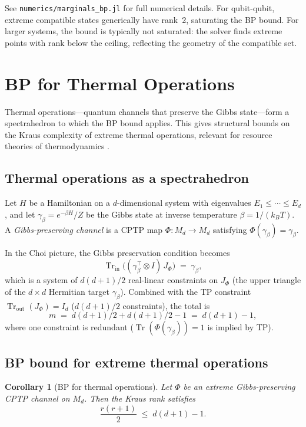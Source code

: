 \documentclass[11pt,a4paper]{article}
\newtheorem{corollary}[theorem]{Corollary}
\theoremstyle{definition}
\newcommand{\Tr}{\operatorname{Tr}}
\begin{document}
\noindent
See \texttt{numerics/marginals\_bp.jl} for full numerical details.
For qubit-qubit, extreme compatible states generically have rank~2,
saturating the BP bound.  For larger systems, the bound is typically
not saturated: the solver finds extreme points with rank below the
ceiling, reflecting the geometry of the compatible set.

\section{BP for Thermal Operations}
\label{sec:thermal}

Thermal operations---quantum channels that preserve the Gibbs
state---form a spectrahedron to which the BP bound applies.
This gives structural bounds on the Kraus complexity of extreme
thermal operations, relevant for resource theories of
thermodynamics \cite{lostaglio19, brandao15}.

\subsection{Thermal operations as a spectrahedron}

Let $H$ be a Hamiltonian on a $d$-dimensional system with
eigenvalues $E_1 \leq \cdots \leq E_d$, and let
$\gamma_\beta = e^{-\beta H}/Z$ be the Gibbs state at inverse
temperature $\beta = 1/(k_B T)$.  A \emph{Gibbs-preserving
channel} is a CPTP map $\Phi \colon M_d \to M_d$ satisfying
$\Phi(\gamma_\beta) = \gamma_\beta$.

In the Choi picture, the Gibbs preservation condition becomes
\[
  \Tr_{\mathrm{in}}\bigl((\gamma_\beta^\top \otimes I)\, J_\Phi\bigr)
  \;=\; \gamma_\beta,
\]
which is a system of $d(d{+}1)/2$ real-linear constraints on
$J_\Phi$ (the upper triangle of the $d \times d$ Hermitian
target $\gamma_\beta$).  Combined with the TP constraint
$\Tr_{\mathrm{out}}(J_\Phi) = I_d$ ($d(d{+}1)/2$ constraints),
the total is
\[
  m \;=\; d(d{+}1)/2 + d(d{+}1)/2 - 1
  \;=\; d(d{+}1) - 1,
\]
where one constraint is redundant ($\Tr(\Phi(\gamma_\beta)) = 1$
is implied by TP).

\subsection{BP bound for extreme thermal operations}

\begin{corollary}[BP for thermal operations]\label{cor:thermal-bp}
Let $\Phi$ be an extreme Gibbs-preserving CPTP channel on $M_d$.
Then the Kraus rank satisfies
\[
  \frac{r(r+1)}{2} \;\leq\; d(d{+}1) - 1.
\]
\end{corollary}
\end{document}
